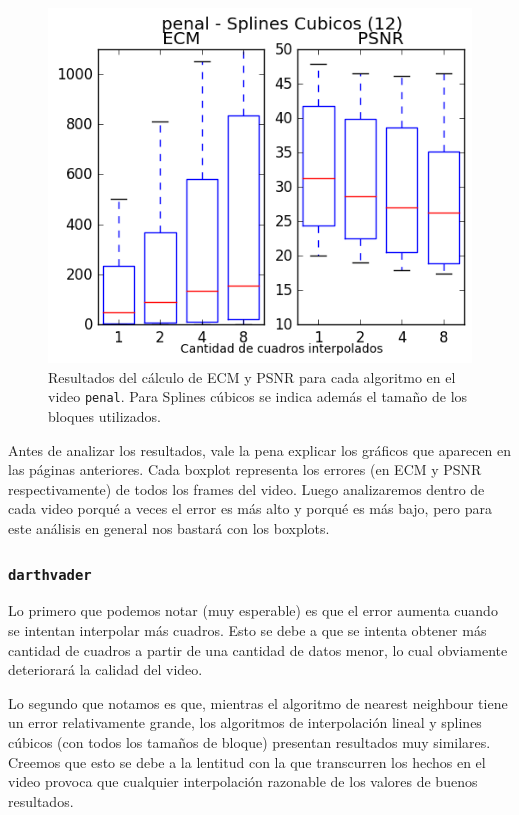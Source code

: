 \begin{figure}[H]
\begin{minipage}{0.33\textwidth}
    \includegraphics[width=1\textwidth]{imgs/resultados_error/penal_4.png} 
\end{minipage}
\label{fig:errpenal}
\caption{\footnotesize Resultados del cálculo de ECM y PSNR para cada algoritmo en el video \texttt{penal}. Para Splines cúbicos se indica además el tamaño de los bloques utilizados.}
\end{figure}

Antes de analizar los resultados, vale la pena explicar los gráficos que aparecen en las páginas anteriores. Cada boxplot representa los errores (en ECM y PSNR respectivamente) de todos los frames del video. Luego analizaremos dentro de cada video porqu\'e a veces el error es más alto y porqu\'e es más bajo, pero para este análisis en general nos bastará con los boxplots.

\subsubsection{\texttt{darthvader}}

Lo primero que podemos notar (muy esperable) es que el error aumenta cuando se intentan interpolar más cuadros. Esto se debe a que se intenta obtener más cantidad de cuadros a partir de una cantidad de datos menor, lo cual obviamente deteriorará la calidad del video.

Lo segundo que notamos es que, mientras el algoritmo de nearest neighbour tiene un error relativamente grande, los algoritmos de interpolación lineal y splines cúbicos (con todos los tamaños de bloque) presentan resultados muy similares. 
Creemos que esto se debe a la lentitud con la que transcurren los hechos en el video provoca que cualquier interpolación razonable de los valores de buenos resultados. 


